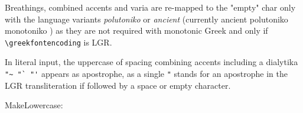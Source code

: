 \documentclass[a4paper]{article}
\newcommand{\GreekLanguageVariant}{%
  \ifx\captionsgreek\captionspolutonikogreek
    \ifx\captionsgreek\captionsancientgreek
      ancient%
    \else
      polutoniko%
    \fi
  \else
    monotoniko%
  \fi
}
\begin{document}
Breathings, combined accents and varia are re-mapped to the "empty" char
only with the language variants \emph{polutoniko} or \emph{ancient}
(currently \GreekLanguageVariant) as they are not required with monotonic
Greek and only if \verb|\greekfontencoding| is LGR.

In literal input, the uppercase of spacing combining accents including a
dialytika \verb|"~ "` "'| appears as apostrophe, as a single \verb|"| stands
for an apostrophe in the LGR transliteration if followed by a space or empty
character.

MakeLowercase:

\begin{quote}
  \MakeLowercase{\GreekExtended}
\end{quote}
\end{document}
